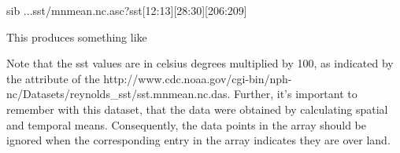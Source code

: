 \documentclass{dods-book}
\begin{document}
\begin{vcode}{sib}
...sst/mnmean.nc.asc?sst[12:13][28:30][206:209]
\end{vcode}

This produces something like


Note that the sst values are in celsius degrees multiplied by 100, as
indicated by the  attribute of the 
{http://www.cdc.noaa.gov/cgi-bin/nph-nc/Datasets/reynolds_sst/sst.mnmean.nc.das}.
Further, it's important to remember with this dataset, that the data
were obtained by calculating spatial and temporal means.
Consequently, the data points in the  array should be ignored
when the corresponding entry in the  array indicates they
are over land.




\end{document}

